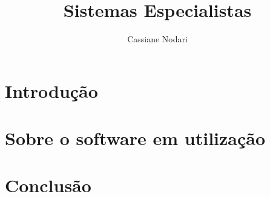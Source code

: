\documentclass[12pt]{article}
\title{Sistemas Especialistas}
\author{Cassiane Nodari\inst{1}}
\begin{document}
 

\maketitle

\section{Introdução}


\section{Sobre o software em utilização}


\section{Conclusão}




\end{document}

